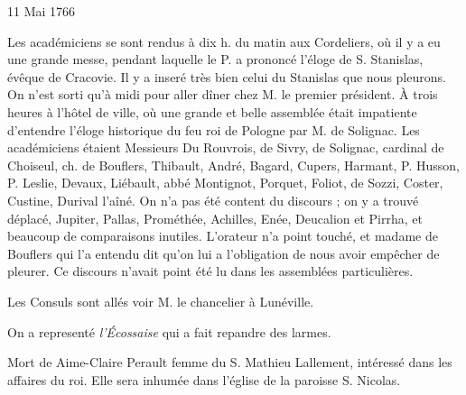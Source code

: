                      \begin{diary}{11 Mai 1766}{}

                         Les académiciens se sont rendus
                           à dix h.
                           du matin aux
                              Cordeliers, où il y a eu une
                           grande messe, pendant laquelle le P.
                           a prononcé l'éloge de S. Stanislas, évêque de
                              Cracovie. Il y a inseré très bien celui du
                           Stanislas que nous pleurons.
                           On n'est sorti
                           qu'à midi pour aller dîner chez
                           M. le premier président.
                           À trois heures à l'hôtel de
                              ville, où une
                           grande et belle assemblée était impatiente
                           d'entendre l'éloge historique du feu roi de Pologne
                           par M. de Solignac. Les
                           académiciens étaient
                           Messieurs
                           Du Rouvrois, de Sivry, de
                           Solignac, cardinal
                              de Choiseul, ch. de Bouflers, Thibault, André,
                           Bagard, Cupers, Harmant,
                              P. Husson, P. Leslie,
                           Devaux, Liébault, abbé
                              Montignot, Porquet,
                           Foliot, de
                              Sozzi, Coster, Custine,
                           Durival l'aîné.
                           On n'a pas été content du discours ; on y a
                           trouvé déplacé, Jupiter,
                              Pallas, Prométhée,
                           Achilles, Enée,
                              Deucalion et Pirrha, et
                           beaucoup
                           de comparaisons inutiles. L'orateur n'a point
                           touché, et madame de Bouflers qui l'a entendu dit qu'on lui a
                           l'obligation de nous avoir
                           empêcher de pleurer. Ce discours n'avait point
                           été lu dans les assemblées particulières. \bigskip


                         Les Consuls sont allés voir M. le chancelier
                           à Lunéville. \bigskip


                         On a representé \emph{l'Écossaise} qui a fait
                           repandre des larmes. \bigskip


                         Mort de Aime-Claire Perault
                           femme du S. Mathieu
                              Lallement, intéressé
                           dans les affaires du roi.
                           Elle sera inhumée
                           dans l’église de la paroisse S. Nicolas.
                        \bigskip


                     \end{diary}

